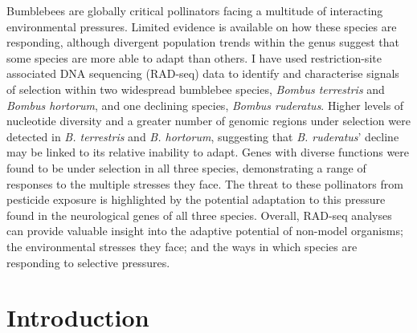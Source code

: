 \documentclass[12pt]{article}
\begin{document}
    
    \begin{linenumbers} 
    \restoregeometry
    
    
    \abstract
    

    Bumblebees are globally critical pollinators facing a multitude of interacting environmental pressures. Limited evidence is available on how these species are responding, although divergent population trends within the genus suggest that some species are more able to adapt than others. I have used restriction-site associated DNA sequencing (RAD-seq) data to identify and characterise signals of selection within two widespread bumblebee species, \emph{Bombus terrestris} and \emph{Bombus hortorum}, and one declining species, \emph{Bombus ruderatus}. Higher levels of nucleotide diversity and a greater number of genomic regions under selection were detected in \emph{B. terrestris} and \emph{B. hortorum}, suggesting that \emph{B. ruderatus}' decline may be linked to its relative inability to adapt. Genes with diverse functions were found to be under selection in all three species, demonstrating a range of responses to the multiple stresses they face.
    The threat to these pollinators from pesticide exposure is highlighted by the potential adaptation to this pressure found in the neurological genes of all three species.
    Overall, RAD-seq analyses can provide valuable insight into the adaptive potential of non-model organisms; the environmental stresses they face; and the ways in which species are responding to selective pressures.
    


    \newpage
    



    \section{Introduction}



\end{linenumbers}
\end{document}
